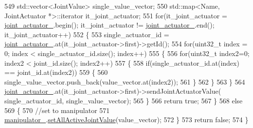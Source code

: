 \begin{DoxyCode}
549     std::vector<JointValue> single\_value\_vector;
550     std::map<Name, JointActuator *>::iterator it\_joint\_actuator;
551     \textcolor{keywordflow}{for}(it\_joint\_actuator = \hyperlink{classrobotis__manipulator_1_1_robotis_manipulator_a54dfb941bb2682d321daea25a373ab1c}{joint\_actuator\_}.begin(); it\_joint\_actuator != 
      \hyperlink{classrobotis__manipulator_1_1_robotis_manipulator_a54dfb941bb2682d321daea25a373ab1c}{joint\_actuator\_}.end(); it\_joint\_actuator++)
552     \{
553       single\_actuator\_id = \hyperlink{classrobotis__manipulator_1_1_robotis_manipulator_a54dfb941bb2682d321daea25a373ab1c}{joint\_actuator\_}.at(it\_joint\_actuator->first)->getId();
554       \textcolor{keywordflow}{for}(uint32\_t index = 0; index < single\_actuator\_id.size(); index++)
555       \{
556         \textcolor{keywordflow}{for}(uint32\_t index2=0; index2 < joint\_id.size(); index2++)
557         \{
558            \textcolor{keywordflow}{if}(single\_actuator\_id.at(index) == joint\_id.at(index2))
559            \{
560              single\_value\_vector.push\_back(value\_vector.at(index2));
561            \}
562         \}
563       \}
564       \hyperlink{classrobotis__manipulator_1_1_robotis_manipulator_a54dfb941bb2682d321daea25a373ab1c}{joint\_actuator\_}.at(it\_joint\_actuator->first)->sendJointActuatorValue(
      single\_actuator\_id, single\_value\_vector);
565     \}
566     \textcolor{keywordflow}{return} \textcolor{keyword}{true};
567   \}
568   \textcolor{keywordflow}{else}
569   \{
570     \textcolor{comment}{//set to manipulator}
571     \hyperlink{classrobotis__manipulator_1_1_robotis_manipulator_a5b2df4a3b3ee7f408cb1d0eaf61644dc}{manipulator\_}.\hyperlink{classrobotis__manipulator_1_1_manipulator_af42c8e7d8b0a1fe505832d632348e804}{setAllActiveJointValue}(value\_vector);
572   \}
573   \textcolor{keywordflow}{return} \textcolor{keyword}{false};
574 \}
\end{DoxyCode}


